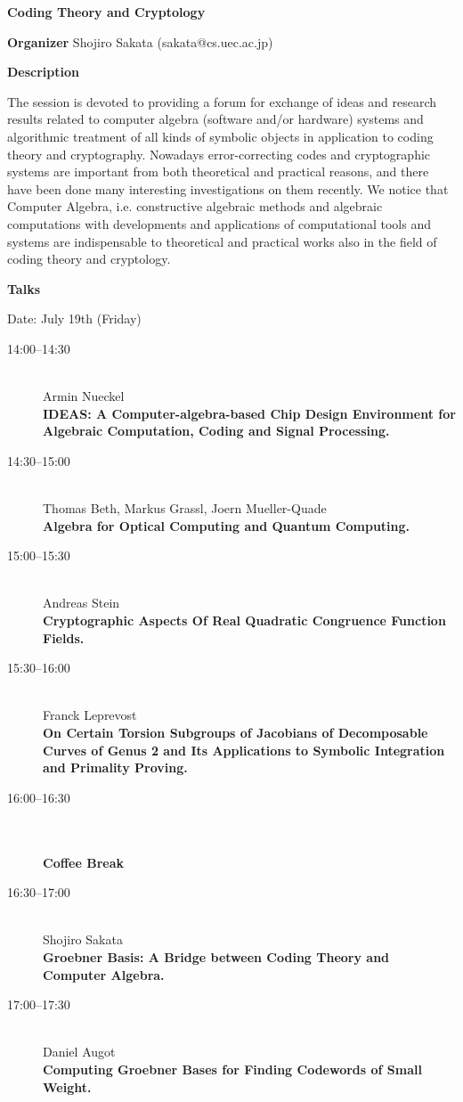 \begin{center}
{\LARGE \bf Coding Theory and Cryptology }
\end{center}
\bigskip

{\bf Organizer}
Shojiro Sakata (sakata@cs.uec.ac.jp) 

\medskip

\bigskip

{\bf Description}
\medskip

The session is devoted to providing a forum for exchange of ideas and research results related to
computer algebra (software and/or hardware) systems and algorithmic treatment of all kinds of
symbolic objects in application to coding theory and cryptography. Nowadays error-correcting
codes and cryptographic systems are important from both theoretical and practical reasons, and
there have been done many interesting investigations on them recently. We notice that Computer
Algebra, i.e. constructive algebraic methods and algebraic computations with developments and
applications of computational tools and systems are indispensable to theoretical and practical
works also in the field of coding theory and cryptology. 

\bigskip
{\bf Talks}
\medskip

Date: July 19th (Friday) 

\begin{description}
\item[14:00--14:30] \ \\
  Armin Nueckel\\
  {\bf IDEAS: A Computer-algebra-based Chip Design Environment for Algebraic
    Computation, Coding and Signal Processing.
    } 
\item[14:30--15:00 ] \ \\
  Thomas Beth, Markus Grassl, Joern Mueller-Quade \\
  {\bf Algebra for Optical Computing and Quantum Computing.} 
\item[15:00--15:30] \ \\
  Andreas Stein\\
  {\bf Cryptographic Aspects Of Real Quadratic Congruence Function Fields.} 
\item[15:30--16:00] \ \\
  Franck Leprevost \\
  {\bf On Certain Torsion Subgroups of Jacobians of Decomposable Curves of Genus 2 and
    Its Applications to Symbolic Integration and Primality Proving.} 
\item[16:00--16:30 ] \ \\
  \\
  {\bf Coffee Break} 
\item[16:30--17:00] \ \\
  Shojiro Sakata\\
  {\bf Groebner Basis: A Bridge between Coding Theory and Computer Algebra.} 
\item[17:00--17:30] \ \\
  Daniel Augot \\
  {\bf Computing Groebner Bases for Finding Codewords of Small Weight.} 
\end{description}

